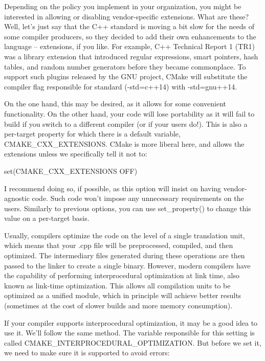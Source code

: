 
Depending on the policy you implement in your organization, you might be interested in allowing or disabling vendor-specific extensions. What are these? Well, let’s just say that the C++ standard is moving a bit slow for the needs of some compiler producers, so they decided to add their own enhancements to the language – extensions, if you like. For example, C++ Technical Report 1 (TR1) was a library extension that introduced regular expressions, smart pointers, hash tables, and random number generators before they became commonplace. To support such plugins released by the GNU project, CMake will substitute the compiler flag responsible for standard (-std=c++14) with -std=gnu++14.

On the one hand, this may be desired, as it allows for some convenient functionality. On the other hand, your code will lose portability as it will fail to build if you switch to a different compiler (or if your users do!). This is also a per-target property for which there is a default variable, CMAKE\_CXX\_EXTENSIONS. CMake is more liberal here, and allows the extensions unless we specifically tell it not to:

\begin{cmake}
set(CMAKE_CXX_EXTENSIONS OFF)
\end{cmake}

I recommend doing so, if possible, as this option will insist on having vendor-agnostic code. Such code won’t impose any unnecessary requirements on the users. Similarly to previous options, you can use set\_property() to change this value on a per-target basis.


Usually, compilers optimize the code on the level of a single translation unit, which means that your .cpp file will be preprocessed, compiled, and then optimized. The intermediary files generated during these operations are then passed to the linker to create a single binary. However, modern compilers have the capability of performing interprocedural optimization at link time, also known as link-time optimization. This allows all compilation units to be optimized as a unified module, which in principle will achieve better results (sometimes at the cost of slower builds and more memory consumption).

If your compiler supports interprocedural optimization, it may be a good idea to use it. We’ll follow the same method. The variable responsible for this setting is called CMAKE\_INTERPROCEDURAL\_OPTIMIZATION. But before we set it, we need to make sure it is supported to avoid errors:

